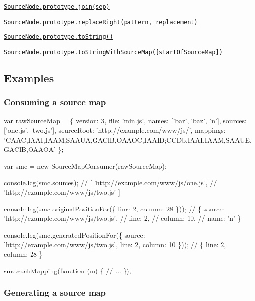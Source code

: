 \begin{DoxyItemize}
\begin{DoxyItemize}
\begin{DoxyItemize}
\item \href{#sourcenodeprototypejoinsep}{\tt Source\+Node.\+prototype.\+join(sep)}
\item \href{#sourcenodeprototypereplacerightpattern-replacement}{\tt Source\+Node.\+prototype.\+replace\+Right(pattern, replacement)}
\item \href{#sourcenodeprototypetostring}{\tt Source\+Node.\+prototype.\+to\+String()}
\item \href{#sourcenodeprototypetostringwithsourcemapstartofsourcemap}{\tt Source\+Node.\+prototype.\+to\+String\+With\+Source\+Map(\mbox{[}start\+Of\+Source\+Map\mbox{]})}
\end{DoxyItemize}
\end{DoxyItemize}
\end{DoxyItemize}

\subsection*{Examples}

\subsubsection*{Consuming a source map}


\begin{DoxyCode}
var rawSourceMap = \{
  version: 3,
  file: 'min.js',
  names: ['bar', 'baz', 'n'],
  sources: ['one.js', 'two.js'],
  sourceRoot: 'http://example.com/www/js/',
  mappings: 'CAAC,IAAI,IAAM,SAAUA,GAClB,OAAOC,IAAID;CCDb,IAAI,IAAM,SAAUE,GAClB,OAAOA'
\};

var smc = new SourceMapConsumer(rawSourceMap);

console.log(smc.sources);
// [ 'http://example.com/www/js/one.js',
//   'http://example.com/www/js/two.js' ]

console.log(smc.originalPositionFor(\{
  line: 2,
  column: 28
\}));
// \{ source: 'http://example.com/www/js/two.js',
//   line: 2,
//   column: 10,
//   name: 'n' \}

console.log(smc.generatedPositionFor(\{
  source: 'http://example.com/www/js/two.js',
  line: 2,
  column: 10
\}));
// \{ line: 2, column: 28 \}

smc.eachMapping(function (m) \{
  // ...
\});
\end{DoxyCode}


\subsubsection*{Generating a source map}

